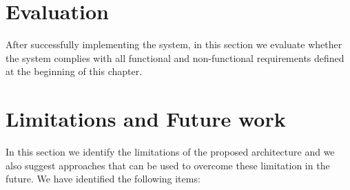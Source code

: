 \documentclass[a4paper, notitlepage]{article}
\begin{document}
\section{Evaluation} 

After successfully implementing the system, in this section we evaluate whether the system complies with all functional and non-functional requirements defined at the beginning of this chapter.

\section{Limitations and Future work}

In this section we identify the limitations of the proposed architecture and we also suggest approaches that can be used to overcome these limitation in the future. We have identified the following items:
\end{document}
